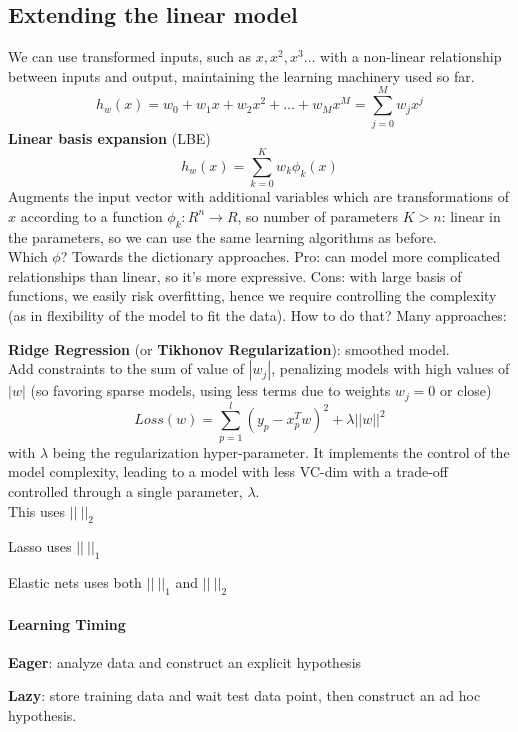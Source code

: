 \documentclass[10pt]{report}
\begin{document}
\subsection{Extending the linear model} We can use transformed inputs, such as $x, x^2, x^3\ldots$ with a non-linear relationship between inputs and output, maintaining the learning machinery used so far. $$h_w(x) = w_0 + w_1 x + w_2 x^2 + \ldots + w_M x^M = \sum_{j=0}^M w_j x^j$$ \textbf{Linear basis expansion} (LBE) $$h_w(x) = \sum_{k=0}^K w_k\phi_k(x)$$ Augments the input vector with additional variables which are transformations of $x$ according to a function $\phi_k : R^n \rightarrow R$, so number of parameters $K > n$: linear in the parameters, so we can use the same learning algorithms as before.\\
Which $\phi$? Towards the dictionary approaches. Pro: can model more complicated relationships than linear, so it's more expressive. Cons: with large basis of functions, we easily risk overfitting, hence we require controlling the complexity (as in flexibility of the model to fit the data). How to do that? Many approaches:
\begin{list}{}{}
	\item \textbf{Ridge Regression} (or \textbf{Tikhonov Regularization}): smoothed model.\\
	Add constraints to the sum of value of $|w_j|$, penalizing models with high values of $|w|$ (so favoring sparse models, using less terms due to weights $w_j = 0$ or close)
	$$Loss(w) = \sum_{p=1}^l (y_p - x_p^T w)^2 + \lambda||w||^2$$ with $\lambda$ being the regularization hyper-parameter. It implements the control of the model complexity, leading to a model with less VC-dim with a trade-off controlled through a single parameter, $\lambda$.\\
	This uses $||\:||_2$
	\item Lasso uses $||\:||_1$
	\item Elastic nets uses both $||\:||_1$ and $||\:||_2$
\end{list}
\paragraph{Learning Timing} \begin{list}{}{}
	\item \textbf{Eager}: analyze data and construct an explicit hypothesis
	\item \textbf{Lazy}: store training data and wait test data point, then construct an ad hoc hypothesis.
\end{list}
\end{document}
